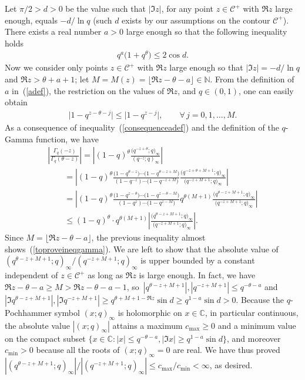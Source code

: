 \documentclass[pdftex]{sigma}
\numberwithin{equation}{section}
\newcommand{\C}{\mathbb{C}}
\newcommand{\N}{\mathbb{N}}
\newcommand{\CC}{\mathcal{C}}
\begin{document}
Let $\pi/2 > d>0$ be the value such that $|\Im z|$, for any point $z\in\CC^+$ with $\Re z$ large enough, equals $-d/\ln{q}$ (such $d$ exists by our assumptions on the contour $\CC^+$). There exists a real number $a > 0$ large enough so that the following inequality holds
\begin{gather}\label{adef}
q^a\big(1 + q^{\theta}\big) \leq 2 \cos d.
\end{gather}
Now we consider only points $z\in\CC^+$ with $\Re z$ large enough so that $|\Im z| = -d/\ln{q}$ and $\Re z > \theta + a + 1$; let $M = M(z) = \lfloor \Re z - \theta - a \rfloor \in\N$. From the def\/inition of~$a$ in~(\ref{adef}), the restriction on the values of $\Re z$, and $q\in (0, 1)$, one can easily obtain
\begin{gather}\label{consequenceadef}
\big|1 - q^{z - \theta - j}\big| \leq \big|1 - q^{z - j}\big|, \qquad \forall\, j = 0, 1, \dots, M.
\end{gather}
As a consequence of inequality~(\ref{consequenceadef}) and the def\/inition of the $q$-Gamma function, we have
\begin{gather*}
\left| \frac{\Gamma_q(-z)}{\Gamma_q(\theta - z)} \right| = \left| (1 - q)^{\theta}\frac{\big(q^{-z+\theta}; q\big)_{\infty}}{(q^{-z}; q)_{\infty}} \right|\\
 \qquad{} = \left| (1 - q)^{\theta}\frac{\big(1 - q^{\theta - z}\big)\cdots \big(1 - q^{\theta - z + M}\big)}{(1 - q^{-z})\cdots\big(1 - q^{-z+M}\big)}\frac{\big(q^{-z+\theta+M+1}; q\big)_{\infty}}{\big(q^{-z+M+1}; q\big)_{\infty}} \right|\\
\qquad{} = \left| (1 - q)^{\theta}\frac{\big(1 - q^{z - \theta}\big)\cdots\big(1 - q^{z - \theta - M}\big)}{(1 - q^z)\cdots \big(1 - q^{z-M}\big)}q^{\theta(M+1)}\frac{\big(q^{\theta - z + M + 1}; q\big)_{\infty}}{\big(q^{-z+M+1}; q\big)_{\infty}} \right|\\
\qquad{} \leq (1 - q)^{\theta}\cdot q^{\theta(M+1)} \left| \frac{\big(q^{\theta-z+M+1}; q\big)_{\infty}}{\big(q^{-z+M+1}; q\big)_{\infty}} \right|.
\end{gather*}
Since $M = \lfloor \Re z - \theta - a\rfloor$, the previous inequality almost shows~(\ref{toproveineqgamma}).
We are left to show that the absolute value of $(q^{\theta-z+M+1}; q)_{\infty}/(q^{-z+M+1}; q)_{\infty}$ is upper bounded by a constant independent of $z\in\CC^+$ as long as $\Re z$ is large enough.
In fact, we have $\Re z - \theta - a\geq M > \Re z - \theta - a - 1$, so~$|q^{\theta-z+M+1}|, |q^{-z+M+1}|\leq q^{-\theta-a}$ and $|\Im q^{\theta - z + M + 1}|, |\Im q^{-z+M+1}| \geq q^{\theta + M + 1 - \Re z}\sin d \geq q^{1-a}\sin d > 0$. Because the $q$-Pochhammer symbol $(x; q)_{\infty}$ is holomorphic on $x\in\C$, in particular continuous, the absolute value $|(x; q)_{\infty}|$ attains a maximum $c_{\max}\geq 0$ and a minimum value  on the compact subset $\{x\in\C\colon |x| \leq q^{-\theta-a}, |\Im x| \geq q^{1-a}\sin d\}$, and moreover $c_{\min} > 0$ because all the roots of $(x; q)_{\infty} = 0$ are real. We have thus proved $|(q^{\theta-z+M+1}; q)_{\infty}|/|(q^{-z+M+1}; q)_{\infty}| \leq c_{\max}/c_{\min} < \infty$, as desired.
\end{document}
